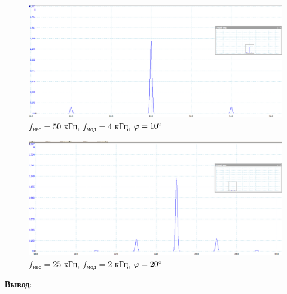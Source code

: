 \documentclass[a4paper,12pt]{article}
\begin{document}
\begin{figure}[H]\label{fig: nu_PM_50kHz_nu_4kHz}
    \centering
    \includegraphics[width = \textwidth]{nu_PM_50kHz_nu_4kHz.png}
    \caption{$f_{нес} = 50$ кГц, $f_{мод} = 4$ кГц, $\varphi = 10\degree$}
\end{figure}
\begin{figure}[H]\label{fig: nu_PM_25kHz_phi_20_nu_2kHz}
    \centering
    \includegraphics[width = \textwidth]{nu_PM_25kHz_phi_20_nu_2kHz.png}
    \caption{$f_{нес} = 25$ кГц, $f_{мод} = 2$ кГц, $\varphi = 20\degree$}
\end{figure}

\textbf{Вывод}:
\end{document}
